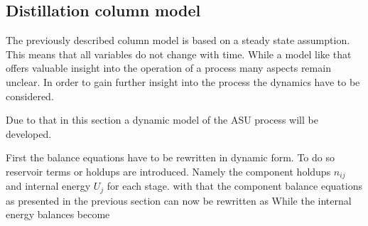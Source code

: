 
\subsection{Distillation column model}
    The previously described column model is based on a steady state assumption. This means that all variables do not
    change with time. While a model like that offers valuable insight into the operation of a process many
    aspects remain unclear. In order to gain further insight into the process the dynamics have to be considered.

    Due to that in this section a dynamic model of the ASU process will be developed.

    First the balance equations have to be rewritten in dynamic form. To do so reservoir terms or holdups
    are introduced. Namely the component holdups $n_{ij}$ and internal energy $U_j$ for each stage.
    with that the component balance equations as presented in the previous section can now be rewritten as
    While the internal energy balances become

